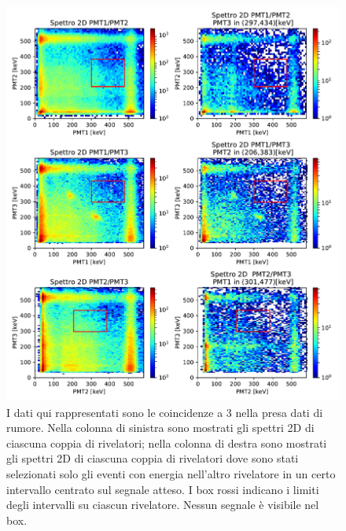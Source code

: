  \begin{figure}[h]
	\hspace{-4em}
	\includegraphics[width=44em]{immagini/3gamma_noise}
	\caption{\label{fig:3gamma_noise} I dati qui rappresentati sono le coincidenze a 3 nella presa dati di rumore. Nella colonna di sinistra sono mostrati gli spettri 2D di ciascuna coppia di rivelatori; nella colonna di destra sono mostrati gli spettri 2D di ciascuna coppia di rivelatori dove sono stati selezionati solo gli eventi con energia nell'altro rivelatore in un certo intervallo centrato sul segnale atteso. I box rossi indicano i limiti degli intervalli su ciascun rivelatore. Nessun segnale è visibile nel box.}
\end{figure}

	



